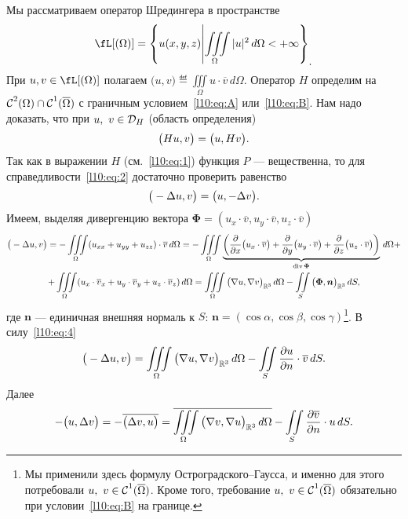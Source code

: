 Мы рассматриваем оператор Шредингера в пространстве 
\begin{equation*}
	\hfill\fL[(\Omega)]=\left\{u(x,y,z)\middle|\iiint\limits_{\Omega}|u|^2\,d\Omega<+\infty\right\}_{\displaystyle.}\hfill
\end{equation*}
При $u,v\in\fL[(\Omega)]$ полагаем $\displaystyle\big(u,v\big)\eqdef\iiint\limits_{\Omega}u\cdot\overline{v}\,d\Omega$. Оператор $H$ определим на $\mathcal{C}{\mathstrut}^{2}_{}(\Omega)\cap\mathcal{C}{\mathstrut}^{1}_{}(\overline{\Omega})$ с граничным условием~\eqref{l10:eq:A} или~\eqref{l10:eq:B}. Нам надо доказать, что при $u,\ v\in\mc{D}_{H}$ (область определения)
\begin{equation}\label{l10:eq:2}
	\hfill\big(Hu,v\big)=\big(u,Hv\big).\hfill
\end{equation}
Так как в выражении $H$ (см.~\eqref{l10:eq:1}) функция $P$ --- вещественна, то для справедливости~\eqref{l10:eq:2} достаточно проверить равенство
\begin{equation}\label{l10:eq:3}
	\hfill\big(-\Delta u,v\big)=\big(u,-\Delta v\big).\hfill
\end{equation}
Имеем, выделяя дивергенцию вектора $\bm{\Phi}=(u_x\cdot\overline{v},u_y\cdot\overline{v},u_z\cdot\overline{v})$
\begin{multline}\label{l10:eq:4}
	\big(-\Delta u,v\big)=-\iiint\limits_{\Omega}(u_{xx}+u_{yy}+u_{zz})\cdot\overline{v}\,d\Omega=-\iiint\limits_{\Omega}\underbrace{\left(\frac{\partial}{\partial x}\big(u_x\cdot\overline{v}\big)+\frac{\partial}{\partial y}\big(u_y\cdot\overline{v}\big)+\frac{\partial}{\partial z}\big(u_z\cdot\overline{v}\big)\right)}_{\operatorname{div}\bm{\Phi}}\,d\Omega+\\
	+\iiint\limits_{\Omega}(u_x\cdot\overline{v}_x+u_y\cdot\overline{v}_y+u_z\cdot\overline{v}_z)\,d\Omega=\iiint\limits_{\Omega}\big(\nabla u,\nabla v\big)_{\mathbb{R}^3}\,d\Omega-\iint\limits_{S}\big(\bm{\Phi},\bm{n}\big)_{\mathbb{R}^3}\,dS,
\end{multline}
где $\bm{n}$ --- единичная внешняя нормаль к $S$: $\bm{n}=(\cos\alpha,\cos\beta,\cos\gamma)$\footnote{Мы применили здесь формулу Остроградского--Гаусса, и именно для этого потребовали $u,\ v\in\Cfn{1}(\overline{\Omega})$. Кроме того, требование $u,\ v\in\Cfn{1}(\overline{\Omega})$ обязательно при условии~\eqref{l10:eq:B} на границе.}. %
В силу~\eqref{l10:eq:4}
\begin{equation}\label{l10:eq:5}
	\big(-\Delta u,v\big)=\iiint\limits_{\Omega}\big(\nabla u,\nabla v\big)_{\mathbb{R}^3}\,d\Omega-\iint\limits_{S}\frac{\partial u}{\partial n}\cdot\overline{v}\,dS.
\end{equation}
Далее
\begin{equation}\label{l10:eq:6}
	-\big(u,\Delta v\big)=-\overline{\big(\Delta v,u\big)}=\overline{\iiint\limits_{\Omega}\big(\nabla v,\nabla u\big)_{\mathbb{R}^3}\,d\Omega}-\iint\limits_{S}\frac{\partial\overline{v}}{\partial n}\cdot u\,dS.
\end{equation}
